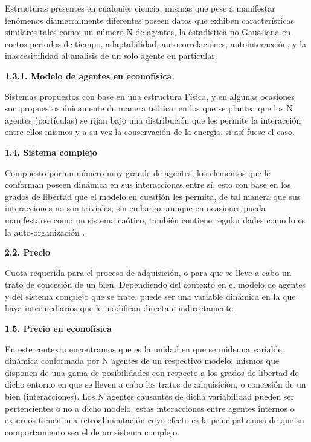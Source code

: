 Estructuras presentes en cualquier ciencia, mismas que pese a manifestar fenómenos diametralmente diferentes poseen datos que exhiben características similares tales como; un número N de agentes, la estadística no Gaussiana en cortos periodos de tiempo, adaptabilidad, autocorrelaciones, autointeracción, y la inaccesibilidad al análisis de un solo agente en particular.
\newline

{
\noindent
\Large  \textbf{1.3.1. Modelo de agentes en econofísica} 
}

Sistemas propuestos con base en una estructura Física, y en algunas ocasiones son propuestos únicamente de manera teórica, en los que se plantea que los N agentes (partículas) se rijan bajo una distribución que les permite la interacción entre ellos mismos y a su vez la conservación de la energía, si así fuese el caso.
\newline

{
\noindent
\Large  \textbf{1.4. Sistema complejo} 
}

Compuesto por un número muy grande de agentes, los elementos que le conforman poseen dinámica en sus interacciones entre sí, esto con base en los grados de libertad que el modelo en cuestión les permita, de tal manera que sus interacciones no son triviales, sin embargo, aunque en ocasiones pueda manifestarse como un sistema caótico, también contiene regularidades como lo es la auto-organización .
\newline

{
\noindent
\Large  \textbf{2.2. Precio} 
}

Cuota requerida para el proceso de adquisición, o para que se lleve a cabo un trato de concesión de un bien. Dependiendo del contexto en el modelo de agentes y del sistema complejo que se trate, puede ser una variable dinámica en la que haya intermediarios que le modifican directa e indirectamente.
\newline

{
\noindent
\Large  \textbf{1.5. Precio en econofísica} 
}

En este contexto encontramos que es la unidad en que se \guillemotleft  mide\guillemotright una variable dinámica conformada por N agentes de un respectivo modelo, mismos que disponen de una gama de posibilidades con respecto a los grados de libertad de dicho entorno en que se lleven a cabo los tratos de adquisición, o concesión de un bien (interacciones). Los N agentes causantes de dicha variabilidad pueden ser pertencientes o no a dicho modelo, estas interacciones entre agentes internos o externos tienen una retroalimentación cuyo efecto es la principal causa de que su comportamiento sea el de un sistema complejo.

